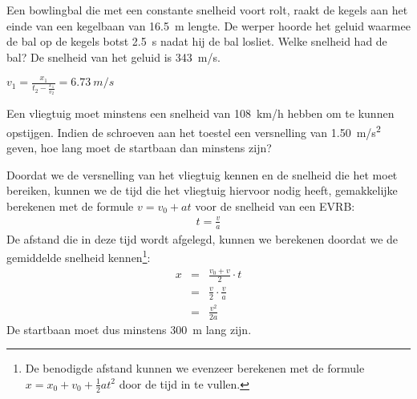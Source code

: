 \documentclass{ximera}
\begin{document}
\begin{exercise}
    Een bowlingbal die met een constante snelheid voort rolt, raakt de kegels aan het einde van een kegelbaan van \SI{16,5}{m} lengte. De werper hoorde het geluid waarmee de bal op de kegels botst \SI{2,5}{s} nadat hij de bal losliet. Welke snelheid had de bal? De snelheid van het geluid is \SI{343}{m/s}. 
    \begin{oplossing}
        $v_1=\frac{x_1}{t_2-\frac{x_1}{v_2}}=\SI{6,73}{m/s}$
    \end{oplossing}
\end{exercise}

\begin{exercise}
    Een vliegtuig moet minstens een snelheid van \SI{108}{km/h} hebben om te kunnen opstijgen. Indien de schroeven aan het toestel een versnelling van \SI{1,50}{m/s^2} geven, hoe lang moet de startbaan dan minstens zijn? 
    \begin{oplossing}
    Doordat we de versnelling van het vliegtuig kennen en de snelheid die het moet bereiken, kunnen we de tijd die het vliegtuig hiervoor nodig heeft, gemakkelijke berekenen met de formule $v=v_0+at$ voor de snelheid van een EVRB:
    \begin{eqnarray*}
        t=\frac{v}{a}
    \end{eqnarray*}
    De afstand die in deze tijd wordt afgelegd, kunnen we berekenen doordat we de gemiddelde snelheid kennen\footnote{De benodigde afstand kunnen we evenzeer berekenen met de formule $x=x_0+v_0+\frac{1}{2}at^2$ door de tijd in te vullen.}:
    \begin{eqnarray*}
    x&=&\frac{v_0+v}{2}\cdot t\\
    &=&\frac{v}{2}\cdot\frac{v}{a}\\
    &=&\frac{v^2}{2a}
    \end{eqnarray*}
    De startbaan moet dus minstens \SI{300}{m} lang zijn.
    \end{oplossing}
\end{exercise}
\end{document}
